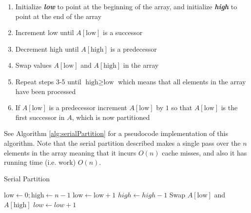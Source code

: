 \documentclass[twocolumn, twoside, 11pt]{article}
\newcommand{\defn}[1]       {{\textit{\textbf{\boldmath #1}}}}
\begin{document}
\begin{enumerate}
	\item{Initialize \defn{low} to point at the beginning of the array, and initialize \defn{high} to point at the end of the array}
	\item{Increment low until $A[\text{low}]$ is a successor}
	\item{Decrement high until $A[\text{high}]$ is a predecessor}
	\item{Swap values $A[\text{low}]$ and $A[\text{high}]$ in the array}
	\item{Repeat steps 3-5 until $\text{high} \geq \text{low}$ which means that all elements in the array have been processed}
	\item{If $A[\text{low}]$ is a predecessor increment $A[\text{low}]$ by $1$ so that $A[\text{low}]$ is the first successor in $A$, which is now partitioned}
\end{enumerate}

See Algorithm \ref{alg:serialPartition} for a pseudocode implementation of this algorithm. 
Note that the serial partition described makes a single pass over the $n$ elements in the array meaning that it incurs $O(n)$ cache misses, and also it has running time (i.e. work) $O(n)$.

\vspace{5mm}
\begin{samepage}
\begin{algorithm}
	\caption{Serial Partition}
	\label{alg:serialPartition}
	\begin{algorithmic}
		\State $\text{low} \gets 0; \text{high} \gets n-1$
				\State $\text{low} \gets \text{low}+1$
			\EndWhile
				\State $high \gets high-1$
			\EndWhile
			\State Swap $A[\text{low}]$ and $A[\text{high}]$
		\EndWhile
			\State $low \gets low+1$
		\EndIf
	\end{algorithmic}	
\end{algorithm}
\end{samepage}
\end{document}
